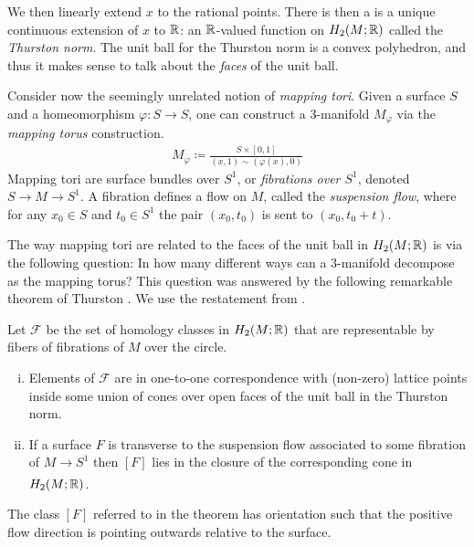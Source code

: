 We then linearly extend $x$ to the rational points.  There is then a is a unique continuous extension of $x$ to $\mathbb{R}$: an $\mathbb{R}$-valued function on $H_2(M; \mathbb{R})$ called the {\it Thurston norm}. The unit ball for the Thurston norm is a convex polyhedron, and thus it makes
sense to talk about the \emph{faces} of the unit ball.

Consider now the seemingly unrelated notion of \emph{mapping tori}.  Given a surface $S$ and a
homeomorphism $\varphi: S \to S$, one can construct a $3$-manifold $M_\varphi$ via the
\emph{mapping torus} construction.
\begin{align*}
  M_\varphi \coloneqq \frac{S \times [0,1]}{(x,1) \sim (\varphi(x), 0)}
\end{align*}
Mapping tori are surface bundles over $S^1$, or \emph{fibrations over $S^1$}, denoted $S\rightarrow M\rightarrow S^1$. A fibration defines a {flow} on $M$,
called the \emph{suspension flow}, where for any $x_0\in S$ and $t_0\in S^1$ the pair $(x_0,t_0)$ is sent to $(x_0,t_0+t)$. %

The way mapping tori are related to the faces of the unit ball in $H_2(M; \mathbb{R})$ is via the following question: In how many different ways can a $3$-manifold decompose as the mapping torus? This question was answered by the following remarkable theorem of Thurston \cite{thurston1986norm}.  We use the restatement from \cite{yazdi2018pseudo}.

\begin{thm}[Thurston]
  \label{thm:Thur1}
  Let $\mathcal{F}$ be the set of homology classes in $H_2(M; \mathbb{R})$ that are representable by fibers of
  fibrations of $M$ over the circle.
\begin{enumerate}[(i)]
\item Elements of $\mathcal{F}$ are in one-to-one correspondence with (non-zero) lattice points
  inside some union of cones over open faces of the unit ball in the Thurston norm.
\item If a surface $F$ is transverse to the suspension flow associated to some fibration of
  $M \xrightarrow[]{} S^1$ then $[F]$ lies in the closure of the corresponding cone in $H_2(M;\mathbb{R})$.
\end{enumerate}
\end{thm}
The class $[F]$ referred to in the theorem has orientation such that the positive flow direction is pointing outwards relative to the surface.

